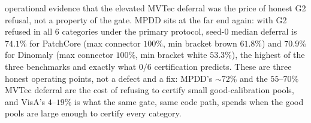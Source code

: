 \documentclass[preprint,11pt]{elsarticle}
\begin{document}
operational evidence that the elevated MVTec deferral was the price of honest G2 refusal, not a
property of the gate. MPDD sits at the far end again: with G2 refused in all $6$ categories under
the primary protocol, seed-$0$ median deferral is $74.1\%$ for PatchCore (max connector $100\%$,
min bracket brown $61.8\%$) and $70.9\%$ for Dinomaly (max connector $100\%$, min bracket white
$53.3\%$), the highest of the three benchmarks and exactly what $0/6$ certification predicts.
These are three honest operating points, not a defect and a fix: MPDD's $\sim 72\%$ and the
$55$--$70\%$ MVTec deferral are the cost of refusing to certify small good-calibration pools,
and VisA's $4$--$19\%$ is what the same gate, same code path, spends when the good pools are large
enough to certify every category.
\end{document}
